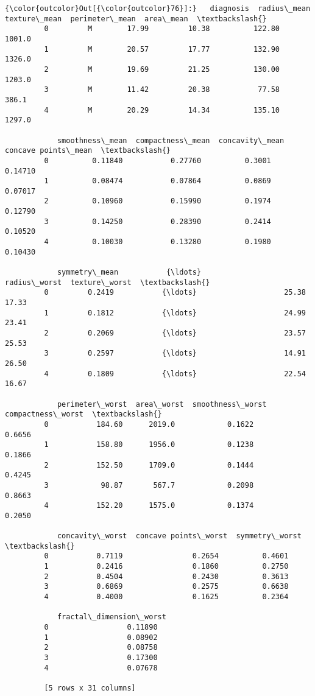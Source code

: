 \documentclass[11pt]{article}
\begin{document}
\begin{Verbatim}[commandchars=\\\{\}]
{\color{outcolor}Out[{\color{outcolor}76}]:}   diagnosis  radius\_mean  texture\_mean  perimeter\_mean  area\_mean  \textbackslash{}
         0         M        17.99         10.38          122.80     1001.0   
         1         M        20.57         17.77          132.90     1326.0   
         2         M        19.69         21.25          130.00     1203.0   
         3         M        11.42         20.38           77.58      386.1   
         4         M        20.29         14.34          135.10     1297.0   
         
            smoothness\_mean  compactness\_mean  concavity\_mean  concave points\_mean  \textbackslash{}
         0          0.11840           0.27760          0.3001              0.14710   
         1          0.08474           0.07864          0.0869              0.07017   
         2          0.10960           0.15990          0.1974              0.12790   
         3          0.14250           0.28390          0.2414              0.10520   
         4          0.10030           0.13280          0.1980              0.10430   
         
            symmetry\_mean           {\ldots}             radius\_worst  texture\_worst  \textbackslash{}
         0         0.2419           {\ldots}                    25.38          17.33   
         1         0.1812           {\ldots}                    24.99          23.41   
         2         0.2069           {\ldots}                    23.57          25.53   
         3         0.2597           {\ldots}                    14.91          26.50   
         4         0.1809           {\ldots}                    22.54          16.67   
         
            perimeter\_worst  area\_worst  smoothness\_worst  compactness\_worst  \textbackslash{}
         0           184.60      2019.0            0.1622             0.6656   
         1           158.80      1956.0            0.1238             0.1866   
         2           152.50      1709.0            0.1444             0.4245   
         3            98.87       567.7            0.2098             0.8663   
         4           152.20      1575.0            0.1374             0.2050   
         
            concavity\_worst  concave points\_worst  symmetry\_worst  \textbackslash{}
         0           0.7119                0.2654          0.4601   
         1           0.2416                0.1860          0.2750   
         2           0.4504                0.2430          0.3613   
         3           0.6869                0.2575          0.6638   
         4           0.4000                0.1625          0.2364   
         
            fractal\_dimension\_worst  
         0                  0.11890  
         1                  0.08902  
         2                  0.08758  
         3                  0.17300  
         4                  0.07678  
         
         [5 rows x 31 columns]
\end{Verbatim}
            
\end{document}
